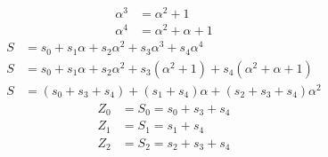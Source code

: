 \documentclass[a4paper,11pt]{exam}
\begin{document}
\begin{align*}
  \alpha^3 &= \alpha^2 + 1\\
  \alpha^4 &= \alpha^2 + \alpha + 1
\end{align*}
\begin{align*}
  S &= s_0 + s_1 \alpha + s_2 \alpha^2 + s_3 \alpha^3 + s_4 \alpha^4 \\
  S &= s_0 + s_1 \alpha + s_2 \alpha^2 + s_3 (\alpha^2 + 1) + s_4 (\alpha^2 + \alpha + 1)  \\
  S &= (s_0 + s_3 + s_4) + (s_1 + s_4)\alpha + (s_2 + s_3 + s_4)\alpha^2
\end{align*}
\begin{align*}
Z_0 &= S_0 = s_0 + s_3 + s_4\\
Z_1 &= S_1 = s_1 + s_4\\
Z_2 &= S_2 = s_2 + s_3 + s_4\\
\end{align*}
\end{document}
